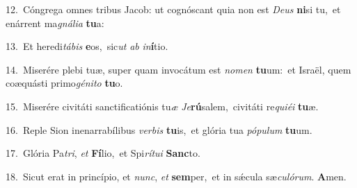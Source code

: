 {\numbfont\textcolor{\numbcolor}{12.}}~Cóngrega omnes tribus Jacob: ut cognóscant quia non est \textit{De}\-\textit{us} \textbf{ni}\-si tu,~\star et enárrent ma\-\textit{gná}\-\textit{li}\textit{a} \textbf{tu}\-a:\par
{\numbfont\textcolor{\numbcolor}{13.}}~Et heredi\-\textit{tá}\-\textit{bis} \textbf{e}\-os,~\star sic\textit{ut} \textit{ab} \textit{in}\-\textbf{í}tio.\par
{\numbfont\textcolor{\numbcolor}{14.}}~Miserére plebi tuæ, super quam invocátum est \textit{no}\-\textit{men} \textbf{tu}\-um:~\star et Israël, quem coæquásti primo\-\textit{gé}\-\textit{ni}\textit{to} \textbf{tu}\-o.\par
{\numbfont\textcolor{\numbcolor}{15.}}~Miserére civitáti sanctificatiónis tu\textit{æ} \textit{Je}\-\textbf{rú}salem,~\star civitáti re\-\textit{qui}\-\textit{é}\textit{i} \textbf{tu}\-æ.\par
{\numbfont\textcolor{\numbcolor}{16.}}~Reple Sion inenarrabílibus \textit{ver}\-\textit{bis} \textbf{tu}\-is,~\star et glória tua \textit{pó}\-\textit{pu}\textit{lum} \textbf{tu}\-um.\par
{\numbfont\textcolor{\numbcolor}{17.}}~Glória Pa\-\textit{tri}\-, \textit{et} \textbf{Fí}\-lio,~\star et Spi\-\textit{rí}\-\textit{tu}\textit{i} \textbf{Sanc}\-to.\par
{\numbfont\textcolor{\numbcolor}{18.}}~Sicut erat in princípio, et \textit{nunc}\-, \textit{et} \textbf{sem}\-per,~\star et in sǽcula sæ\-\textit{cu}\-\textit{ló}\textit{rum}. \textbf{A}\-men.\par
